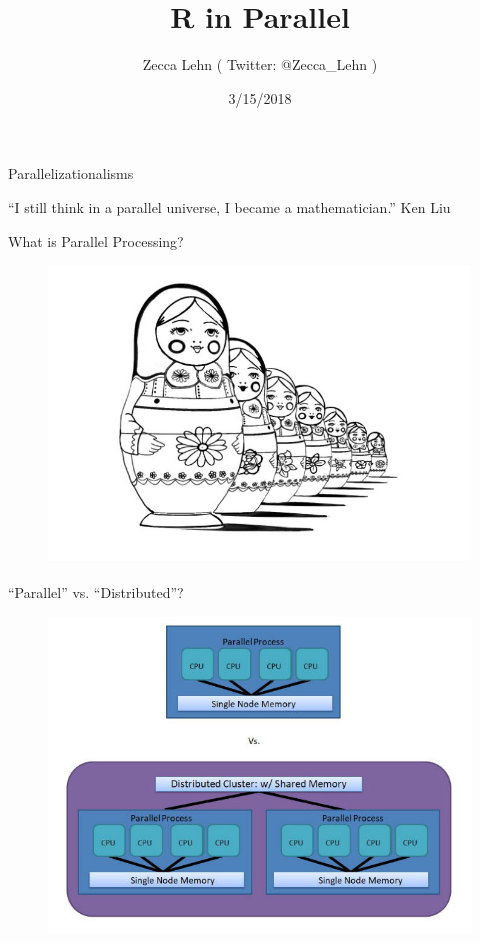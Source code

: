 \documentclass[ignorenonframetext,]{beamer}
\title{R in Parallel}
\author{Zecca Lehn ( Twitter: @Zecca\_Lehn )}
\date{3/15/2018}
\begin{document}
\frame{\titlepage}

\begin{frame}{Parallelizationalisms}

``I still think in a parallel universe, I became a mathematician.'' Ken
Liu

\begin{block}{What is Parallel Processing?}

\begin{figure}
\centering
\includegraphics{images/russian-dolls-resized.jpg}
\caption{}
\end{figure}

\end{block}

\begin{block}{``Parallel'' vs. ``Distributed''?}

\begin{figure}
\centering
\includegraphics{images/Parallel_vs_Distributed.jpg}
\caption{}
\end{figure}


\end{block}
\end{frame}
\end{document}
